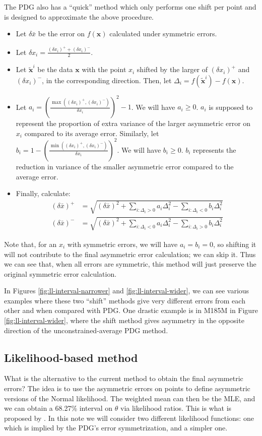 \documentclass[12pt]{article}
\begin{document}
The PDG also has a ``quick'' method which only performs one shift per point and is designed to approximate the above procedure.

\begin{itemize}
    \item Let $\delta \bar{x}$ be the error on $f(\mathbf{x})$ calculated under symmetric errors.
    \item Let $\delta x_i=\frac{(\delta x_i)^++(\delta x_i)^-}{2}$.
    \item Let $\tilde{\mathbf{x}}^i$ be the data $\mathbf{x}$ with the point $x_i$ shifted by the larger of $(\delta x_i)^+$ and $(\delta x_i)^-$, in the corresponding direction. Then, let $\Delta_i=f(\tilde{\mathbf{x}}^i)-f(\mathbf{x})$.
    \item Let $a_i=\left(\frac{\max((\delta x_i)^+,(\delta x_i)^-)}{\delta x_i}\right)^2-1$. We will have $a_i\geq0$. $a_i$ is supposed to represent the proportion of extra variance of the larger asymmetric error on $x_i$ compared to its average error. Similarly, let $b_i=1-\left(\frac{\min((\delta x_i)^+,(\delta x_i)^-)}{\delta x_i}\right)^2$. We will have $b_i\geq0$. $b_i$ represents the reduction in variance of the smaller asymmetric error compared to the average error.
    \item Finally, calculate:
    \begin{align*}
        (\delta \bar{x})^+&=\sqrt{(\delta \bar{x})^2 + \sum_{i:\Delta_i>0}a_i\Delta_i^2-\sum_{i:\Delta_i<0}b_i\Delta_i^2}\\
        (\delta \bar{x})^-&=\sqrt{(\delta \bar{x})^2 + \sum_{i:\Delta_i<0}a_i\Delta_i^2-\sum_{i:\Delta_i>0}b_i\Delta_i^2}
    \end{align*}
\end{itemize}
Note that, for an $x_i$ with symmetric errors, we will have $a_i=b_i=0$, so shifting it will not contribute to the final asymmetric error calculation; we can skip it. Thus we can see that, when all errors are symmetric, this method will just preserve the original symmetric error calculation.

In Figures \ref{fig:ll-interval-narrower} and \ref{fig:ll-interval-wider}, we can see various examples where these two ``shift'' methods give very different errors from each other and when compared with PDG. One drastic example is in M185M in Figure \ref{fig:ll-interval-wider}, where the shift method gives asymmetry in the opposite direction of the unconstrained-average PDG method.


\subsection{Likelihood-based method}
What is the alternative to the current method to obtain the final asymmetric errors? The idea is to use the asymmetric errors on points to define asymmetric versions of the Normal likelihood. The weighted mean can then be the MLE, and we can obtain a 68.27\% interval on $\theta$ via likelihood ratios. This is what is proposed by \citet[sec.~3]{barlow2024asymmetric}. In this note we will consider two different likelihood functions: one which is implied by the PDG's error symmetrization, and a simpler one.
\end{document}
